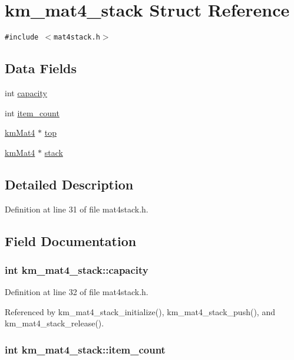 \hypertarget{structkm__mat4__stack}{
\section{km\_\-mat4\_\-stack Struct Reference}
\label{structkm__mat4__stack}
}
{\tt \#include $<$mat4stack.h$>$}

\subsection*{Data Fields}
\begin{CompactItemize}
\item 
int \hyperlink{structkm__mat4__stack_069785a0a19481b635a91076f78547c7}{capacity}
\item 
int \hyperlink{structkm__mat4__stack_a29b07b2cae7bb1a8fbb699ec0ee3383}{item\_\-count}
\item 
\hyperlink{structkm_mat4}{kmMat4} $\ast$ \hyperlink{structkm__mat4__stack_487ba8aa0a0176eb21899bd8bc38f153}{top}
\item 
\hyperlink{structkm_mat4}{kmMat4} $\ast$ \hyperlink{structkm__mat4__stack_a8b2b968718d212c80d7923d9de6a0a8}{stack}
\end{CompactItemize}


\subsection{Detailed Description}


Definition at line 31 of file mat4stack.h.

\subsection{Field Documentation}
\hypertarget{structkm__mat4__stack_069785a0a19481b635a91076f78547c7}{
\subsubsection[{capacity}]{\setlength{\rightskip}{0pt plus 5cm}int {\bf km\_\-mat4\_\-stack::capacity}}}
\label{structkm__mat4__stack_069785a0a19481b635a91076f78547c7}




Definition at line 32 of file mat4stack.h.

Referenced by km\_\-mat4\_\-stack\_\-initialize(), km\_\-mat4\_\-stack\_\-push(), and km\_\-mat4\_\-stack\_\-release().\hypertarget{structkm__mat4__stack_a29b07b2cae7bb1a8fbb699ec0ee3383}{
\subsubsection[{item\_\-count}]{\setlength{\rightskip}{0pt plus 5cm}int {\bf km\_\-mat4\_\-stack::item\_\-count}}}
\label{structkm__mat4__stack_a29b07b2cae7bb1a8fbb699ec0ee3383}




